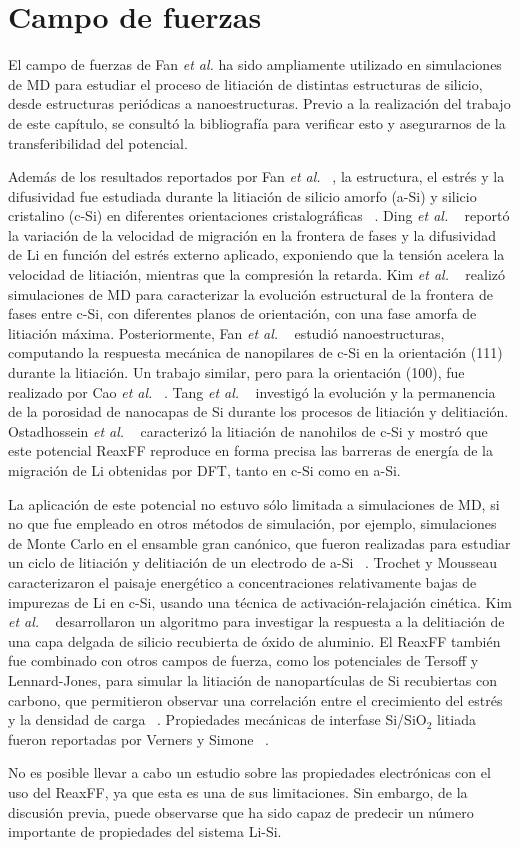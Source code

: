 \section{Campo de fuerzas}

El campo de fuerzas de Fan \textit{et al.} ha sido ampliamente utilizado en 
simulaciones de MD para estudiar el proceso de litiación de distintas estructuras
de silicio, desde estructuras periódicas a nanoestructuras. Previo a la 
realización del trabajo de este capítulo, se consultó la bibliografía para 
verificar esto y asegurarnos de la transferibilidad del potencial. 

Además de los resultados reportados por Fan \textit{et al.} ~\cite{fan2013}, 
la estructura, el estrés y la difusividad fue estudiada durante la litiación de 
silicio amorfo (a-Si) y silicio cristalino (c-Si) en diferentes orientaciones 
cristalográficas ~\cite{chen2020, kim2015}. Ding \textit{et al.} ~\cite{ding2017} 
reportó la variación de la velocidad de migración en la frontera de fases y la 
difusividad de Li en función del estrés externo aplicado, exponiendo que la 
tensión acelera la velocidad de litiación, mientras que la compresión la retarda. 
Kim \textit{et al.} ~\cite{kim2014} realizó simulaciones de MD para caracterizar 
la evolución estructural de la frontera de fases entre c-Si, con diferentes planos 
de orientación, con una fase amorfa de litiación máxima. Posteriormente, Fan 
\textit{et al.} ~\cite{fan2018} estudió nanoestructuras, computando la respuesta
mecánica de nanopilares de c-Si en la orientación (111) durante la litiación.
Un trabajo similar, pero para la orientación (100), fue realizado por Cao 
\textit{et al.} ~\cite{cao2019}. Tang \textit{et al.} ~\cite{tang2019} investigó
la evolución y la permanencia de la porosidad de nanocapas de Si durante los 
procesos de litiación y delitiación. Ostadhossein \textit{et al.} 
~\cite{ostadhossein2015} caracterizó la litiación de nanohilos de c-Si y mostró
que este potencial ReaxFF reproduce en forma precisa las barreras de energía de 
la migración de Li obtenidas por DFT, tanto en c-Si como en a-Si.

La aplicación de este potencial no estuvo sólo limitada a simulaciones de MD, 
si no que fue empleado en otros métodos de simulación, por ejemplo, simulaciones 
de Monte Carlo en el ensamble gran canónico, que fueron realizadas para estudiar 
un ciclo de litiación y delitiación de un electrodo de a-Si ~\cite{basu2019}. 
Trochet y Mousseau ~\cite{trochet2017} caracterizaron el paisaje energético a 
concentraciones relativamente bajas de impurezas de Li en c-Si, usando una 
técnica de activación-relajación cinética. Kim \textit{et al.} ~\cite{kim2017} 
desarrollaron un algoritmo para investigar la respuesta a la delitiación de una 
capa delgada de silicio recubierta de óxido de aluminio. El ReaxFF también fue 
combinado con otros campos de fuerza, como los potenciales de Tersoff y 
Lennard-Jones, para simular la litiación de nanopartículas de Si recubiertas con 
carbono, que permitieron observar una correlación entre el crecimiento del 
estrés y la densidad de carga ~\cite{zheng2019,zheng2020}. Propiedades mecánicas 
de interfase Si/SiO$_2$ litiada fueron reportadas por Verners y 
Simone ~\cite{verners2019}. 

No es posible llevar a cabo un estudio sobre las propiedades electrónicas con el 
uso del ReaxFF, ya que esta es una de sus limitaciones. Sin embargo, de la 
discusión previa, puede observarse que ha sido capaz de predecir un número 
importante de propiedades del sistema Li-Si.
